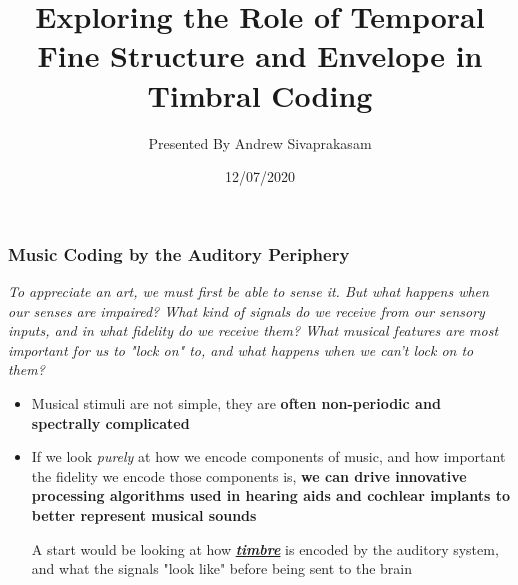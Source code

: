 \documentclass[aspectratio=1610]{beamer}
\title{Exploring the Role of Temporal Fine Structure and Envelope in Timbral Coding}
\author{Presented By Andrew Sivaprakasam}
\date{12/07/2020}
\begin{document}
\frame{\titlepage}

\begin{frame}
\frametitle{Music Coding by the Auditory Periphery}

\textit{To appreciate an art, we must first be able to sense it. But what happens when our senses are impaired? What kind of signals do we receive from our sensory inputs, and in what fidelity do we receive them? What musical features are most important for us to "lock on" to, and what happens when we can't lock on to them?}\vspace{.5em}

\begin{itemize}[label = $\blacktriangleright$]
\item Musical stimuli are not simple, they are \textbf{often non-periodic and spectrally complicated}
\item If we look \textit{purely} at how we encode components of music, and how important the fidelity we encode those components is, \textbf{we can drive innovative processing algorithms used in hearing aids and cochlear implants to better represent musical sounds}\vspace{1em}

A start would be looking at how \textbf{\textit{\underline{timbre}}} is encoded by the auditory system, and what the signals "look like" before being sent to the brain

\end{itemize}
\end{frame}
\end{document}
